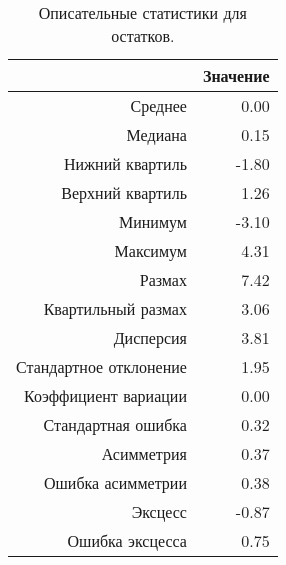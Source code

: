 \begin{table}[ht]
\centering
\begin{tabular}{rr}
  \hline
 & Значение \\ 
  \hline
Среднее & 0.00 \\ 
  Медиана & 0.15 \\ 
  Нижний квартиль & -1.80 \\ 
  Верхний квартиль & 1.26 \\ 
  Минимум & -3.10 \\ 
  Максимум & 4.31 \\ 
  Размах & 7.42 \\ 
  Квартильный размах & 3.06 \\ 
  Дисперсия & 3.81 \\ 
  Стандартное отклонение & 1.95 \\ 
  Коэффициент вариации & 0.00 \\ 
  Стандартная ошибка & 0.32 \\ 
  Асимметрия & 0.37 \\ 
  Ошибка асимметрии & 0.38 \\ 
  Эксцесс & -0.87 \\ 
  Ошибка эксцесса & 0.75 \\ 
   \hline
\end{tabular}
\caption{Описательные статистики для остатков.} 
\label{table:resid_dstats}
\end{table}

